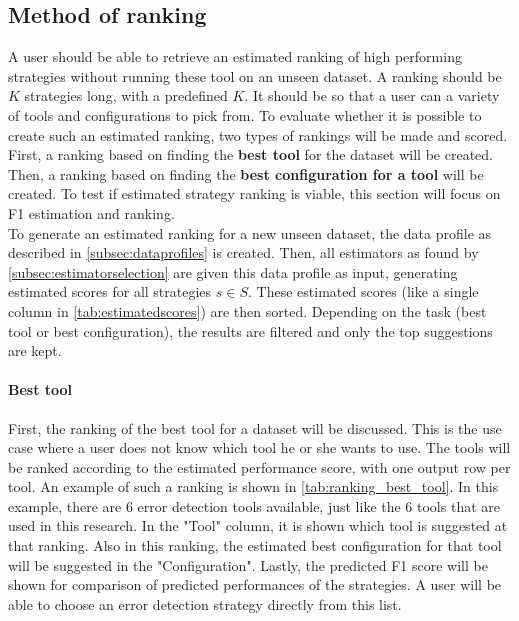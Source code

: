 \subsection{Method of ranking}
A user should be able to retrieve an estimated ranking of high performing strategies without running these tool on an unseen dataset. A ranking should be $K$ strategies long, with a predefined $K$. It should be so that a user can a variety of tools and configurations to pick from. To evaluate whether it is possible to create such an estimated ranking, two types of rankings will be made and scored. First, a ranking based on finding the \textbf{best tool} for the dataset will be created. Then, a ranking based on finding the \textbf{best configuration for a tool} will be created.
To test if estimated strategy ranking is viable, this section will focus on F1 estimation and ranking. 
\\To generate an estimated ranking for a new unseen dataset, the data profile as described in \autoref{subsec:dataprofiles} is created. Then, all estimators as found by \autoref{subsec:estimatorselection} are given this data profile as input, generating estimated scores for all strategies $s \in S$. These estimated scores (like a single column in \autoref{tab:estimatedscores}) are then sorted. Depending on the task (best tool or best configuration), the results are filtered and only the top suggestions are kept.

\paragraph{Best tool} First, the ranking of the best tool for a dataset will be discussed. This is the use case where a user does not know which tool he or she wants to use. The tools will be ranked according to the estimated performance score, with one output row per tool. An example of such a ranking is shown in \autoref{tab:ranking_best_tool}. In this example, there are 6 error detection tools available, just like the 6 tools that are used in this research. In the "Tool" column, it is shown which tool is suggested at that ranking. Also in this ranking, the estimated best configuration for that tool will be suggested in the "Configuration". Lastly, the predicted F1 score will be shown for comparison of predicted performances of the strategies. A user will be able to choose an error detection strategy directly from this list.

